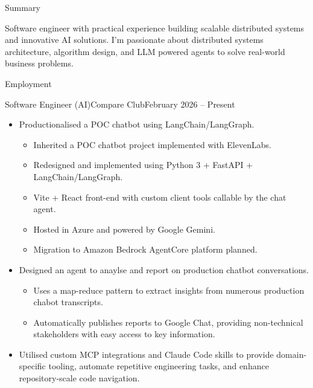 \documentclass[]{mcdowellcv}
\begin{document}
\makeheader

\begin{cvsection}{Summary}
\begin{cvsubsection}{}{}{}
Software engineer with practical experience building scalable distributed systems and innovative AI solutions.
I’m passionate about distributed systems architecture, algorithm design, and LLM powered agents to solve real-world business problems.
\end{cvsubsection}
\end{cvsection}

\begin{cvsection}{Employment}

\begin{cvsubsection}{Software Engineer (AI)}{Compare Club}{February 2026 -- Present}
\begin{itemize}
\item Productionalised a POC chatbot using LangChain/LangGraph.
    \begin{itemize}
    \item Inherited a POC chatbot project implemented with ElevenLabs.
    \item Redesigned and implemented using Python 3 + FastAPI + LangChain/LangGraph.
    \item Vite + React front-end with custom client tools callable by the chat agent.
    \item Hosted in Azure and powered by Google Gemini.
    \item Migration to Amazon Bedrock AgentCore platform planned.
    \end{itemize}
\item Designed an agent to anaylse and report on production chatbot conversations.
    \begin{itemize}
        \item Uses a map-reduce pattern to extract insights from numerous production chabot transcripts.
        \item Automatically publishes reports to Google Chat, providing non-technical stakeholders with easy access to key information.
    \end{itemize}
\item Utilised custom MCP integrations and Claude Code skills to provide domain-specific tooling, automate repetitive engineering tasks, and enhance repository-scale code navigation.
\end{itemize}
\end{cvsubsection}


\end{cvsection}
\end{document}
